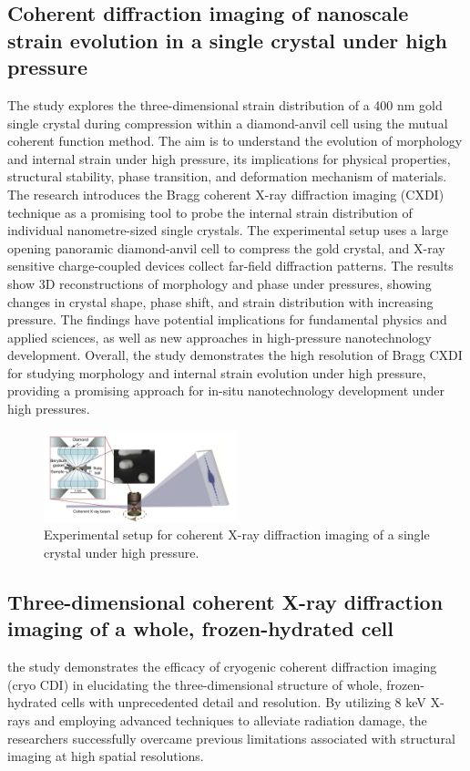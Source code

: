 \documentclass[12pt, a4paper, twocolumn]{article}
\begin{document}
\subsection{Coherent diffraction imaging of nanoscale strain evolution in a single crystal under high pressure}
\par The study explores the three-dimensional strain distribution of a 400 nm gold single crystal during compression within a diamond-anvil cell using the mutual coherent function method. The aim is to understand the evolution of morphology and internal strain under high pressure, its implications for physical properties, structural stability, phase transition, and deformation mechanism of materials. The research introduces the Bragg coherent X-ray diffraction imaging (CXDI) technique as a promising tool to probe the internal strain distribution of individual nanometre-sized single crystals. The experimental setup uses a large opening panoramic diamond-anvil cell to compress the gold crystal, and X-ray sensitive charge-coupled devices collect far-field diffraction patterns. The results show 3D reconstructions of morphology and phase under pressures, showing changes in crystal shape, phase shift, and strain distribution with increasing pressure. The findings have potential implications for fundamental physics and applied sciences, as well as new approaches in high-pressure nanotechnology development. Overall, the study demonstrates the high resolution of Bragg CXDI for studying morphology and internal strain evolution under high pressure, providing a promising approach for in-situ nanotechnology development under high pressures.
\begin{figure}[h]
	\includegraphics[width=0.5\textwidth]{expsetup.png}
	\caption{Experimental setup for coherent X-ray diffraction imaging of a single crystal under high pressure.
	}
\end{figure}

\subsection{Three-dimensional coherent X-ray diffraction imaging of a whole, frozen-hydrated cell}
the study demonstrates the efficacy of cryogenic coherent diffraction imaging (cryo CDI) in elucidating the three-dimensional structure of whole, frozen-hydrated cells with unprecedented detail and resolution. By utilizing 8 keV X-rays and employing advanced techniques to alleviate radiation damage, the researchers successfully overcame previous limitations associated with structural imaging at high spatial resolutions.
\end{document}
